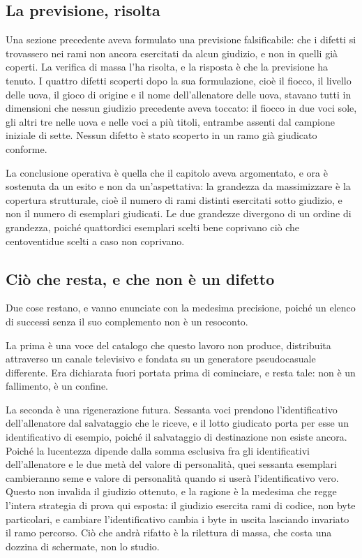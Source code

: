\subsection*{La previsione, risolta}

Una sezione precedente aveva formulato una previsione falsificabile: che i difetti si trovassero nei rami non ancora esercitati da alcun giudizio, e non in quelli già coperti. La verifica di massa l'ha risolta, e la risposta è che la previsione ha tenuto. I quattro difetti scoperti dopo la sua formulazione, cioè il fiocco, il livello delle uova, il gioco di origine e il nome dell'allenatore delle uova, stavano tutti in dimensioni che nessun giudizio precedente aveva toccato: il fiocco in due voci sole, gli altri tre nelle uova e nelle voci a più titoli, entrambe assenti dal campione iniziale di sette. Nessun difetto è stato scoperto in un ramo già giudicato conforme.

La conclusione operativa è quella che il capitolo aveva argomentato, e ora è sostenuta da un esito e non da un'aspettativa: la grandezza da massimizzare è la copertura strutturale, cioè il numero di rami distinti esercitati sotto giudizio, e non il numero di esemplari giudicati. Le due grandezze divergono di un ordine di grandezza, poiché quattordici esemplari scelti bene coprivano ciò che centoventidue scelti a caso non coprivano.

\subsection*{Ciò che resta, e che non è un difetto}

Due cose restano, e vanno enunciate con la medesima precisione, poiché un elenco di successi senza il suo complemento non è un resoconto.

La prima è una voce del catalogo che questo lavoro non produce, distribuita attraverso un canale televisivo e fondata su un generatore pseudocasuale differente. Era dichiarata fuori portata prima di cominciare, e resta tale: non è un fallimento, è un confine.

La seconda è una rigenerazione futura. Sessanta voci prendono l'identificativo dell'allenatore dal salvataggio che le riceve, e il lotto giudicato porta per esse un identificativo di esempio, poiché il salvataggio di destinazione non esiste ancora. Poiché la lucentezza dipende dalla somma esclusiva fra gli identificativi dell'allenatore e le due metà del valore di personalità, quei sessanta esemplari cambieranno seme e valore di personalità quando si userà l'identificativo vero. Questo non invalida il giudizio ottenuto, e la ragione è la medesima che regge l'intera strategia di prova qui esposta: il giudizio esercita rami di codice, non byte particolari, e cambiare l'identificativo cambia i byte in uscita lasciando invariato il ramo percorso. Ciò che andrà rifatto è la rilettura di massa, che costa una dozzina di schermate, non lo studio.

